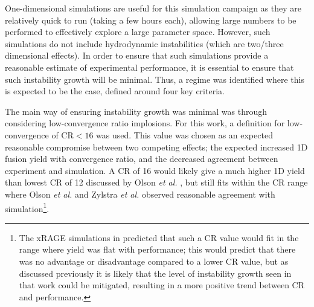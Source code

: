 One-dimensional simulations are useful for this simulation campaign as they are relatively quick to run (taking a few hours each), allowing large numbers to be performed to effectively explore a large parameter space. However, such simulations do not include hydrodynamic instabilities (which are two/three dimensional effects). In order to ensure that such simulations provide a reasonable estimate of experimental performance, it is essential to ensure that such instability growth will be minimal. Thus, a regime was identified where this is expected to be the case, defined around four key criteria.

The main way of ensuring instability growth was minimal was through considering low-convergence ratio implosions. For this work, a definition for low-convergence of CR$<16$ was used. This value was chosen as an expected reasonable compromise between two competing effects; the expected increased 1D fusion yield with convergence ratio, and the decreased agreement between experiment and simulation. A CR of 16 would likely give a much higher 1D yield than lowest CR of 12 discussed by Olson \textit{et al.} \cite{Olson2016}, but still fits within the CR range where Olson \textit{et al.} \cite{Olson2016} and Zylstra \textit{et al.} \cite{Zylstra2018} observed reasonable agreement with simulation\footnote{ The xRAGE simulations in \cite{Haines2017a} predicted that such a CR value would fit in the range where yield was flat with performance; this would predict that there was no advantage or disadvantage compared to a lower CR value, but as discussed previously it is likely that the level of instability growth seen in that work could be mitigated, resulting in a more positive trend between CR and performance.}. 


